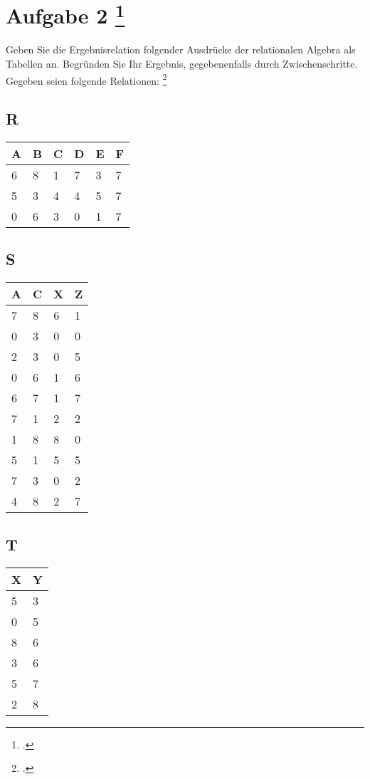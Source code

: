 \documentclass{bschlangaul-aufgabe}
\begin{document}

\section{Aufgabe 2
\footcite[Thema 2 Teilaufgabe 2 Aufgabe 2]{examen:46116:2018:09}}

Geben Sie die Ergebnisrelation folgender Ausdrücke der relationalen
Algebra als Tabellen an. Begründen Sie Ihr Ergebnis, gegebenenfalls
durch Zwischenschritte. Gegeben seien folgende Relationen:
\footcite[Seite 1, Aufgabe 1]{db:ab:3}

\bigskip

\begin{minipage}[t]{5cm}
\subsection*{R}
\begin{tabular}{llllll}
A & B & C & D & E & F \\\hline
6 & 8 & 1 & 7 & 3 & 7 \\
5 & 3 & 4 & 4 & 5 & 7 \\
0 & 6 & 3 & 0 & 1 & 7
\end{tabular}
\end{minipage}
%
\begin{minipage}[t]{3.8cm}
\subsection*{S}
\begin{tabular}{llll}
A & C & X & Z \\\hline
7 & 8 & 6 & 1 \\
0 & 3 & 0 & 0 \\
2 & 3 & 0 & 5 \\
0 & 6 & 1 & 6 \\
6 & 7 & 1 & 7 \\
7 & 1 & 2 & 2 \\
1 & 8 & 8 & 0 \\
5 & 1 & 5 & 5 \\
7 & 3 & 0 & 2 \\
4 & 8 & 2 & 7 \\
\end{tabular}
\end{minipage}
%
\begin{minipage}[t]{2cm}
\subsection*{T}
\begin{tabular}{ll}
X & Y \\\hline
5 & 3 \\
0 & 5 \\
8 & 6 \\
3 & 6 \\
5 & 7 \\
2 & 8 \\
\end{tabular}
\end{minipage}
\end{document}
